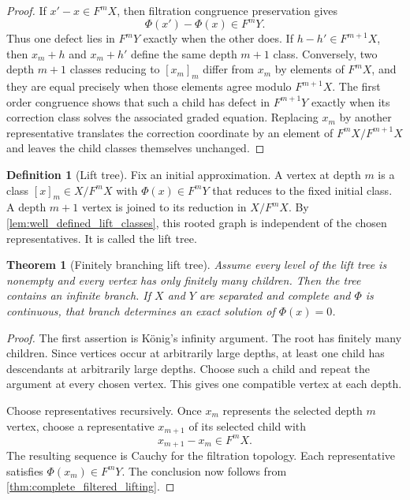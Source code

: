 \documentclass[11pt,a4paper]{article}
\newtheorem{theorem}{Theorem}[section]
\theoremstyle{plain}
\theoremstyle{definition}
\newtheorem{definition}[definition]{Definition}
\theoremstyle{remark}
\begin{document}
\begin{proof}
If $x'-x\in F^mX$, then filtration congruence preservation gives
\[
\Phi(x')-\Phi(x)\in F^mY.
\]
Thus one defect lies in $F^mY$ exactly when the other does.  If $h-h'\in F^{m+1}X$, then $x_m+h$ and $x_m+h'$ define the same depth $m+1$ class.  Conversely, two depth $m+1$ classes reducing to $[x_m]_m$ differ from $x_m$ by elements of $F^mX$, and they are equal precisely when those elements agree modulo $F^{m+1}X$.  The first order congruence shows that such a child has defect in $F^{m+1}Y$ exactly when its correction class solves the associated graded equation.  Replacing $x_m$ by another representative translates the correction coordinate by an element of $F^mX/F^{m+1}X$ and leaves the child classes themselves unchanged.
\end{proof}

\begin{definition}[Lift tree]\label{def:lift_tree}
Fix an initial approximation.  A vertex at depth $m$ is a class $[x]_m\in X/F^mX$ with $\Phi(x)\in F^mY$ that reduces to the fixed initial class.  A depth $m+1$ vertex is joined to its reduction in $X/F^mX$.  By \cref{lem:well_defined_lift_classes}, this rooted graph is independent of the chosen representatives.  It is called the lift tree.
\end{definition}

\begin{theorem}[Finitely branching lift tree]\label{thm:finitely_branching_lift_tree}
Assume every level of the lift tree is nonempty and every vertex has only finitely many children.  Then the tree contains an infinite branch.  If $X$ and $Y$ are separated and complete and $\Phi$ is continuous, that branch determines an exact solution of $\Phi(x)=0$.
\end{theorem}

\begin{proof}
The first assertion is K\"onig's infinity argument.  The root has finitely many children.  Since vertices occur at arbitrarily large depths, at least one child has descendants at arbitrarily large depths.  Choose such a child and repeat the argument at every chosen vertex.  This gives one compatible vertex at each depth.

Choose representatives recursively.  Once $x_m$ represents the selected depth $m$ vertex, choose a representative $x_{m+1}$ of its selected child with
\[
x_{m+1}-x_m\in F^mX.
\]
The resulting sequence is Cauchy for the filtration topology.  Each representative satisfies $\Phi(x_m)\in F^mY$.  The conclusion now follows from \cref{thm:complete_filtered_lifting}.
\end{proof}
\end{document}
